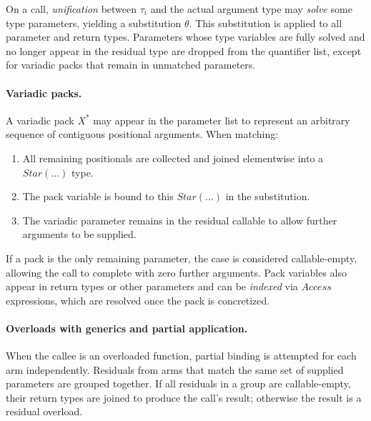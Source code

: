 On a call, \emph{unification} between $\tau_i$ and the actual argument type may
\emph{solve} some type parameters, yielding a substitution $\theta$.
This substitution is applied to all parameter and return types.
Parameters whose type variables are fully solved and no longer appear in the residual type
are dropped from the quantifier list, except for variadic packs that remain in unmatched parameters.

\paragraph{Variadic packs.}
A variadic pack $X^*$ may appear in the parameter list to represent an arbitrary
sequence of contiguous positional arguments.
When matching:
\begin{enumerate}
    \item All remaining positionals are collected and joined elementwise into a $Star(\dots)$ type.
    \item The pack variable is bound to this $Star(\dots)$ in the substitution.
    \item The variadic parameter remains in the residual callable to allow further arguments to be supplied.
\end{enumerate}
If a pack is the only remaining parameter, the case is considered callable-empty,
allowing the call to complete with zero further arguments.
Pack variables also appear in return types or other parameters and can be \emph{indexed}
via $Access$ expressions, which are resolved once the pack is concretized.

\paragraph{Overloads with generics and partial application.}
When the callee is an overloaded function, partial binding is attempted
for each arm independently.
Residuals from arms that match the same set of supplied parameters are grouped together.
If all residuals in a group are callable-empty, their return types are joined
to produce the call's result; otherwise the result is a residual overload.

